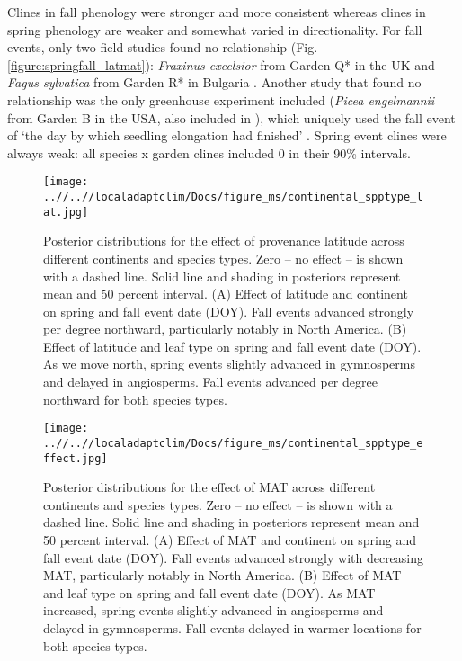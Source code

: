\documentclass{article}
\begin{document}

Clines in fall phenology were stronger and more consistent whereas clines in spring phenology are weaker and somewhat varied in directionality. For fall events, only two field studies found no relationship (Fig. \ref{figure:springfall_latmat}): \emph{Fraxinus excelsior} from Garden Q* in the UK \citep{rosique22} and \emph{Fagus sylvatica} from Garden R* in Bulgaria \citep{petkova17}. Another study that found no relationship was the only greenhouse experiment included (\emph{Picea engelmannii} from Garden B in the USA, also included in \citealp{AitkenBemmels16}), which uniquely used the fall event of `the day by which seedling elongation had finished' \citep{rehfeldt94}. Spring event clines were always weak: all species x garden clines included 0 in their 90\% intervals.

\begin{figure}[!h] 
    \centering
 \texttt{[image: ..//..//localadaptclim/Docs/figure\_ms/continental\_spptype\_lat.jpg]}
    \caption{Posterior distributions for the effect of provenance latitude across different continents and species types. Zero -- no effect -- is shown with a dashed line. Solid line and shading in posteriors represent mean and 50 percent interval. (A) Effect of latitude and continent on spring and fall event date (DOY). Fall events advanced strongly per degree northward, particularly notably in North America. (B) Effect of latitude and leaf type on spring and fall event date (DOY). As we move north, spring events slightly advanced in gymnosperms and delayed in angiosperms. Fall events advanced per degree northward for both species types.}
    \label{figure:continental_spptype_lat}
\end{figure}

\begin{figure}[!h] 
    \centering
 \texttt{[image: ..//..//localadaptclim/Docs/figure\_ms/continental\_spptype\_effect.jpg]}
    \caption{Posterior distributions for the effect of MAT across different continents and species types. Zero -- no effect -- is shown with a dashed line. Solid line and shading in posteriors represent mean and 50 percent interval. (A) Effect of MAT and continent on spring and fall event date (DOY). Fall events advanced strongly with decreasing MAT, particularly notably in North America. (B) Effect of MAT and leaf type on spring and fall event date (DOY). As MAT increased, spring events slightly advanced in angiosperms and delayed in gymnosperms. Fall events delayed in warmer locations for both species types.}
    \label{figure:continental_spptype_effect}
\end{figure}
\end{document}
